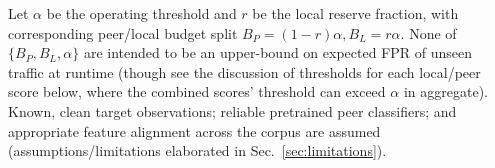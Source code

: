  

Let $\alpha$ be the operating threshold and $r$ be the local reserve fraction, with corresponding peer/local budget split $B_P=(1-r)\alpha, B_L=r\alpha$. None of $\{B_P,B_L,\alpha\}$ are intended to be an upper-bound on expected FPR of unseen traffic at runtime (though see the discussion of thresholds for each local/peer score below, where the combined scores' threshold can exceed $\alpha$ in aggregate). Known, clean target observations; reliable pretrained peer classifiers; and appropriate feature alignment across the corpus are assumed (assumptions/limitations elaborated in Sec.~\ref{sec:limitations}).